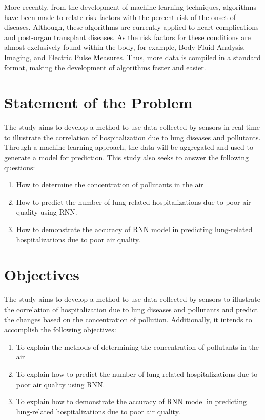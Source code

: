 ﻿\documentclass[10pt,11pt,12pt,oneside]{book}
\begin{document}
    More recently, from the development of machine learning techniques, algorithms have been made to relate risk factors with the percent risk of the onset of diseases. Although, these algorithms are currently applied to heart complications and post-organ transplant diseases. As the risk factors for these conditions are almost exclusively found within the body, for example, Body Fluid Analysis, Imaging, and Electric Pulse Measures. Thus, more data is compiled in a standard format, making the development of algorithms faster and easier.
    \section{Statement of the Problem}

    The study aims to develop a method to use data collected by sensors in real time to illustrate the correlation of hospitalization due to lung diseases and pollutants. Through a machine learning approach, the data will be aggregated and used to generate a model for prediction. This study also seeks to answer the following questions:
    \begin{enumerate}
        \item How to determine the concentration of pollutants in the air
        \item How to predict the number of lung-related hospitalizations due to poor air quality using RNN.
        \item How to demonstrate the accuracy of RNN model in predicting lung-related hospitalizations due to poor air quality.
    \end{enumerate}
    \section{Objectives}
    The study aims to develop a method to use data collected by sensors to illustrate the correlation of hospitalization due to lung diseases and pollutants and predict the changes based on the concentration of pollution. Additionally, it intends to accomplish the following objectives:
    \begin{enumerate}
        \item To explain the methods of determining the concentration of pollutants in the air
        \item To explain how to predict the number of lung-related hospitalizations due to poor air quality using RNN.
        \item To explain how to demonstrate the accuracy of RNN model in predicting lung-related hospitalizations due to poor air quality.
    \end{enumerate}
\end{document}
